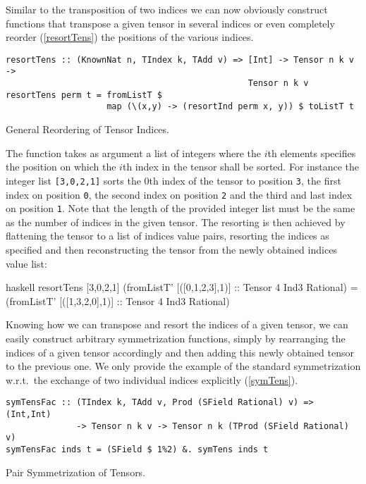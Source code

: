 Similar to the transposition of two indices we can now obviously construct functions that transpose a given tensor in several indices or even completely reorder (\ref{resortTens}) the positions of the various indices. 
\begin{listing}[hbt!]
\begin{verbatim}
resortTens :: (KnownNat n, TIndex k, TAdd v) => [Int] -> Tensor n k v ->
                                                Tensor n k v
resortTens perm t = fromListT $
                    map (\(x,y) -> (resortInd perm x, y)) $ toListT t
\end{verbatim} 
\caption{General Reordering of Tensor Indices.}\label{resortTens}
\end{listing}
The function takes as argument a list of integers where the $i$th elements specifies the position on which the $i$th index in the tensor shall be sorted. For instance the integer list \texttt{[3,0,2,1]} sorts the 0th index of the tensor to position \texttt{3}, the first index on position \texttt{0}, the second index on position \texttt{2} and the third and last index on position \texttt{1}. Note that the length of the provided integer list must be the same as the number of indices in the given tensor.  The resorting is then achieved by flattening the tensor to a list of indices value pairs, resorting the indices as specified and then reconstructing the tensor from the newly obtained indices value list:
\begin{center}
\begin{cminted}{haskell}
resortTens [3,0,2,1] (fromListT' [([0,1,2,3],1)] :: Tensor 4 Ind3 Rational)
= (fromListT' [([1,3,2,0],1)] :: Tensor 4 Ind3 Rational)
\end{cminted}
\end{center}
Knowing how we can transpose and resort the indices of a given tensor, we can easily construct arbitrary symmetrization functions, simply by rearranging the indices of a given tensor accordingly and then adding this newly obtained tensor to the previous one. We only provide the example of the standard symmetrization w.r.t.\ the exchange of two individual indices explicitly (\ref{symTens}).

\begin{listing}[hbt!] 
\begin{verbatim}
symTensFac :: (TIndex k, TAdd v, Prod (SField Rational) v) => (Int,Int)
              -> Tensor n k v -> Tensor n k (TProd (SField Rational) v)
symTensFac inds t = (SField $ 1%2) &. symTens inds t
\end{verbatim} 
\caption{Pair Symmetrization of Tensors.}\label{symTens}
\end{listing}

